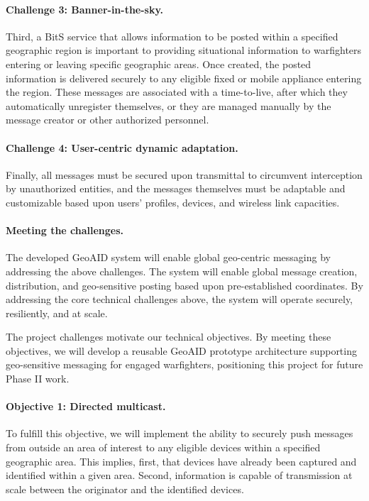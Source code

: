 \documentclass{sbir}
\begin{document}
\paragraph{Challenge 3: Banner-in-the-sky.} Third, a BitS service that allows information to be posted within a specified geographic region is important to providing situational information to warfighters entering or leaving specific geographic areas. Once created, the posted information is  delivered securely to any eligible fixed or mobile appliance entering the region. These messages are associated with a time-to-live, after which they automatically unregister themselves, or they are managed manually by the message creator or other authorized personnel.

\paragraph{Challenge 4: User-centric dynamic adaptation.} Finally, all messages must be secured upon transmittal to circumvent interception by unauthorized entities, and the messages themselves must be adaptable and customizable based upon users' profiles, devices, and wireless link capacities.

\paragraph{Meeting the challenges.} The developed GeoAID system will enable global geo-centric messaging by addressing the above challenges. The system will enable global message creation, distribution, and geo-sensitive posting based upon pre-established coordinates. By addressing the core technical challenges above, the system will operate securely, resiliently, and at scale.

{The project challenges motivate our technical objectives. By meeting these objectives, we will develop a reusable GeoAID prototype architecture supporting geo-sensitive messaging for engaged warfighters, positioning this project for future Phase II work.}

\paragraph{Objective 1: Directed multicast.} To fulfill this objective, we will implement the ability to securely push messages from outside an area of interest to any eligible devices within a specified geographic area. This implies, first, that devices have already been captured and identified within a given area. Second, information is capable of transmission at scale between the originator and the identified devices.
\end{document}
